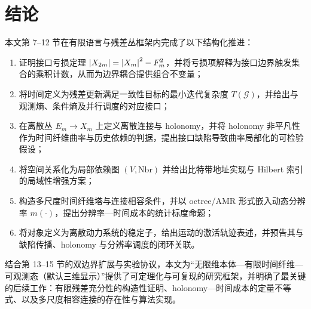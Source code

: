 \section{结论}

本文第 7--12 节在有限语言与残差丛框架内完成了以下结构化推进：
\begin{enumerate}
  \item 证明接口亏损定理 $\left\lvert X_{2m}\right\rvert=\left\lvert X_m\right\rvert^2-F_m^2$，并将亏损项解释为接口边界触发集合的乘积计数，从而为边界耦合提供组合不变量；
  \item 将时间定义为残差更新满足一致性目标的最小迭代复杂度 $T(\mathcal G)$，并给出与观测熵、条件熵及并行调度的对应接口；
  \item 在离散丛 $E_m\to X_m$ 上定义离散连接与 holonomy，并将 holonomy 非平凡性作为时间纤维曲率与历史依赖的判据，提出接口缺陷导致曲率局部化的可检验假设；
  \item 将空间关系化为局部依赖图 $(V,\mathrm{Nbr})$ 并给出比特带地址实现与 Hilbert 索引的局域性增强方案；
  \item 构造多尺度时间纤维塔与连接相容条件，并以 octree/AMR 形式嵌入动态分辨率 $m(\cdot)$，提出分辨率—时间成本的统计标度命题；
  \item 将对象定义为离散动力系统的稳定子，给出运动的激活轨迹表述，并预告其与缺陷传播、holonomy 与分辨率调度的闭环关联。
\end{enumerate}

结合第 13--15 节的双边界扩展与实验协议，本文为“无限维本体—有限时间纤维—可观测态（默认三维显示）”提供了可定理化与可复现的研究框架，并明确了最关键的后续工作：有限残差充分性的构造性证明、holonomy—时间成本的定量不等式、以及多尺度相容连接的存在性与算法实现。
